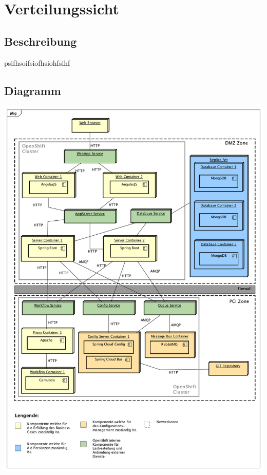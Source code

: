 \graphicspath{{./images/}}

\chapter{Verteilungssicht}

\section{Beschreibung}
psifhsoifsiofhsiohfsihf

\section{Diagramm}

\begin{center}
	\includegraphics[scale=0.46]{OpenShiftDeployment.png}
\end{center}
